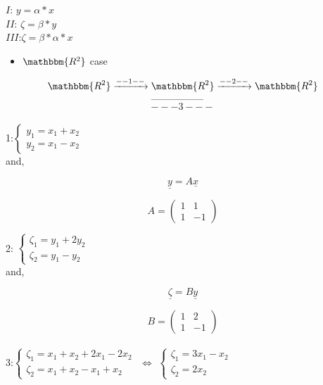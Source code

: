 \documentclass[]{article}
\providecommand{\tightlist}{%
  \setlength{\itemsep}{0pt}\setlength{\parskip}{0pt}}
\begin{document}
\(I\): \(y=\alpha*x\)\\[2\baselineskip] \(II\):
\(\zeta=\beta*y\)\\[2\baselineskip] \(III\):\(\zeta=\beta*\alpha*x\)

\begin{itemize}
\tightlist
\item
  \(\mathbbm{R^2}\) case
\end{itemize}

\[\mathbbm{R^2}\xrightarrow{--1--}\mathbbm{R^2}\xrightarrow{--2--}\mathbbm{R^2}\]
\[\overrightarrow{---3---}\]\\

1:\(\begin{cases} y_1 = x_1 + x_2\\ y_2 = x_1 - x_2 \end{cases}\)\\[2\baselineskip]
and,

\begin{equation}\label{eqn:matrix}\underline{y}=A\underline{x}\end{equation}

\[A = \begin{pmatrix} 1 & 1 \\ 1 & -1 \end{pmatrix}\]

2:
\(\begin{cases} \zeta_1= y_1 + 2y_2\\ \zeta_2 = y_1 - y_2 \end{cases}\)\\

and,

\begin{equation}\label{eqn:matrix}\underline{\zeta}=B\underline{y}\end{equation}

\[B = \begin{pmatrix} 1 & 2 \\ 1 & -1 \end{pmatrix}\]\\

3:\(\begin{cases} \zeta_1= x_1 + x_2 + 2x_1 - 2x_2 \\ \zeta_2 = x_1 + x_2 - x_1 + x_2 \end{cases}\)
\(\Longleftrightarrow\)
\(\begin{cases} \zeta_1= 3x_1 - x_2\\ \zeta_2 = 2x_2 \end{cases}\)\\
\end{document}
